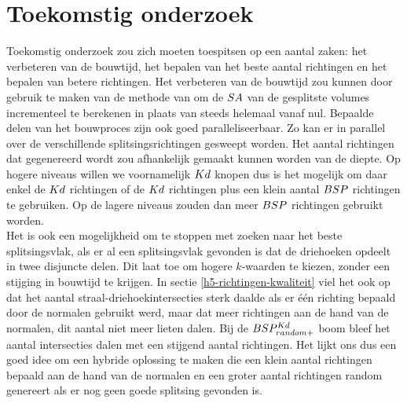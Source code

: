 \section{Toekomstig onderzoek}
Toekomstig onderzoek zou zich moeten toespitsen op een aantal zaken: het verbeteren van de bouwtijd, het bepalen van het beste aantal richtingen en het bepalen van betere richtingen.
Het verbeteren van de bouwtijd zou kunnen door gebruik te maken van de methode van \authorBudge{} \cite{Budge} om de $SA$ van de gesplitste volumes incrementeel te berekenen in plaats van steeds helemaal vanaf nul.
Bepaalde delen van het bouwproces zijn ook goed paralleliseerbaar. 
Zo kan er in parallel over de verschillende splitsingsrichtingen gesweept worden.
Het aantal richtingen dat gegenereerd wordt zou afhankelijk gemaakt kunnen worden van de diepte.
Op hogere niveaus willen we voornamelijk $Kd$ knopen dus is het mogelijk om daar enkel de $Kd$ richtingen of de $Kd$ richtingen plus een klein aantal $BSP$ richtingen te gebruiken. Op de lagere niveaus zouden dan meer $BSP$ richtingen gebruikt worden.\\

Het is ook een mogelijkheid om te stoppen met zoeken naar het beste splitsingsvlak, als er al een splitsingsvlak gevonden is dat de driehoeken opdeelt in twee disjuncte delen.
Dit laat toe om hogere $k$-waarden te kiezen, zonder een stijging in bouwtijd te krijgen.
In sectie \ref{h5-richtingen-kwaliteit} viel het ook op dat het aantal straal-driehoekintersecties sterk daalde als er één richting bepaald door de normalen gebruikt werd, maar dat meer richtingen aan de hand van de normalen, dit aantal niet meer lieten dalen.
Bij de $BSP^{Kd}_{random+}$ boom bleef het aantal intersecties dalen met een stijgend aantal richtingen.
Het lijkt ons dus een goed idee om een hybride oplossing te maken die een klein aantal richtingen bepaald aan de hand van de normalen en een groter aantal richtingen random genereert als er nog geen goede splitsing gevonden is.
